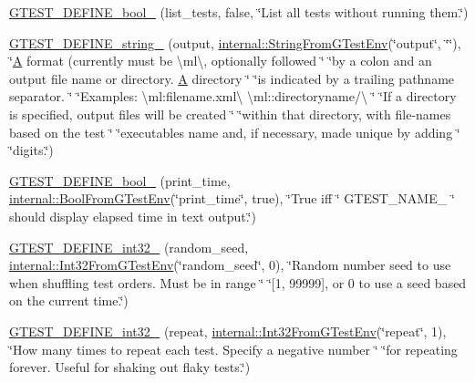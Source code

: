 \begin{DoxyCompactItemize}
\item 
\hyperlink{namespacetesting_a0fa31ecbf33c5e5970cca1d91c050153}{G\+T\+E\+S\+T\+\_\+\+D\+E\+F\+I\+N\+E\+\_\+bool\+\_\+} (list\+\_\+tests, false, \char`\"{}List all tests without running them.\char`\"{})
\item 
\hyperlink{namespacetesting_a6f67b9169db6b5872f61d462b113cb85}{G\+T\+E\+S\+T\+\_\+\+D\+E\+F\+I\+N\+E\+\_\+string\+\_\+} (output, \hyperlink{namespacetesting_1_1internal_ac54dabc540bf79c2de91add679bfb93b}{internal\+::\+String\+From\+G\+Test\+Env}(\char`\"{}output\char`\"{}, \char`\"{}\char`\"{}), \char`\"{}\hyperlink{namespacetesting_a5e9134d655d2fc9323902348083282e7}{A} format (currently must be \textbackslash{}ml\textbackslash{}, optionally followed \char`\"{} \char`\"{}by a colon and an output file name or directory. \hyperlink{namespacetesting_a5e9134d655d2fc9323902348083282e7}{A} directory \char`\"{} \char`\"{}is indicated by a trailing pathname separator. \char`\"{} \char`\"{}Examples\+: \textbackslash{}ml\+:filename.\+xml\textbackslash{} \textbackslash{}ml\+::directoryname/\textbackslash{} \char`\"{} \char`\"{}If a directory is specified, output files will be created \char`\"{} \char`\"{}within that directory, with file-\/names based on the test \char`\"{} \char`\"{}executable\textquotesingle{}s name and, if necessary, made unique by adding \char`\"{} \char`\"{}digits.\char`\"{})
\item 
\hyperlink{namespacetesting_a766fcba2ec951940e528276919a5d22f}{G\+T\+E\+S\+T\+\_\+\+D\+E\+F\+I\+N\+E\+\_\+bool\+\_\+} (print\+\_\+time, \hyperlink{namespacetesting_1_1internal_a67132cdce23fb71b6c38ee34ef81eb4c}{internal\+::\+Bool\+From\+G\+Test\+Env}(\char`\"{}print\+\_\+time\char`\"{}, true), \char`\"{}True iff \char`\"{} G\+T\+E\+S\+T\+\_\+\+N\+A\+M\+E\+\_\+ \char`\"{} should display elapsed time in text output.\char`\"{})
\item 
\hyperlink{namespacetesting_a9900d8db2670a26999fbc2a9130f7185}{G\+T\+E\+S\+T\+\_\+\+D\+E\+F\+I\+N\+E\+\_\+int32\+\_\+} (random\+\_\+seed, \hyperlink{namespacetesting_1_1internal_a0f7e728793f9e6cb0aa2b69eaa468bf3}{internal\+::\+Int32\+From\+G\+Test\+Env}(\char`\"{}random\+\_\+seed\char`\"{}, 0), \char`\"{}Random number seed to use when shuffling test orders.  Must be in range \char`\"{} \char`\"{}\mbox{[}1, 99999\mbox{]}, or 0 to use a seed based on the current time.\char`\"{})
\item 
\hyperlink{namespacetesting_aae6f1140f03d7bf24067df0f6628e9ea}{G\+T\+E\+S\+T\+\_\+\+D\+E\+F\+I\+N\+E\+\_\+int32\+\_\+} (repeat, \hyperlink{namespacetesting_1_1internal_a0f7e728793f9e6cb0aa2b69eaa468bf3}{internal\+::\+Int32\+From\+G\+Test\+Env}(\char`\"{}repeat\char`\"{}, 1), \char`\"{}How many times to repeat each test.  Specify a negative number \char`\"{} \char`\"{}for repeating forever.  Useful for shaking out flaky tests.\char`\"{})

\end{DoxyCompactItemize}
